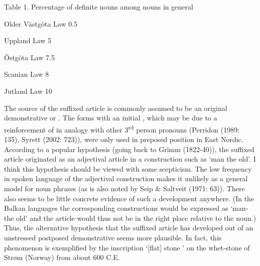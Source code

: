 Table 1. Percentage of definite nouns among nouns in general

Older Västgöta Law  0.5


Uppland Law  5


Östgöta Law  7.5


Scanian Law  8


Jutland Law  10


The source of the suffixed article is commonly assumed to be an original demonstrative  or . The forms with an initial , which may be due to a reinforcement of  in analogy with other 3\textsuperscript{rd} person pronouns (Perridon (1989: 135), Syrett (2002: 723)), were only used in preposed position in East Nordic. According to a popular hypothesis (going back to Grimm (1822-40)), the suffixed article originated as an adjectival article in a construction such as ‘man the old’. I think this hypothesis should be viewed with some scepticism. The low frequency in spoken language of the adjectival construction makes it unlikely as a general model for noun phrases (as is also noted by Seip \& Saltveit (1971: 63)). There also seems to be little concrete evidence of such a development anywhere. (In the Balkan languages the corresponding constructions would be expressed as ‘man-the old’ and the article would thus not be in the right place relative to the noun.)  Thus, the alternative hypothesis that the suffixed article has developed out of an unstressed postposed demonstrative seems more plausible.  In fact, this phenomenon is exemplified by the inscription  ‘[flat] stone ’ on the whet-stone of Strøm (Norway) from about 600 C.E. 

